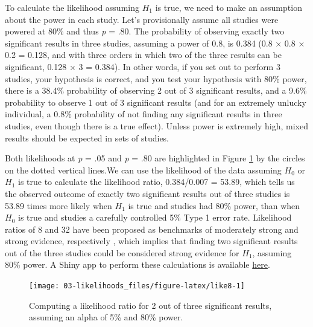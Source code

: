 \documentclass[
  oneside]{book}
\begin{document}
To calculate the likelihood assuming \(H_1\) is true, we need to make an assumption about the power in each study. Let's provisionally assume all studies were powered at 80\% and thus \emph{p} = .80. The probability of observing exactly two significant results in three studies, assuming a power of 0.8, is 0.384 (0.8 × 0.8 × 0.2 = 0.128, and with three orders in which two of the three results can be significant, 0.128 × 3 = 0.384). In other words, if you set out to perform 3 studies, your hypothesis is correct, and you test your hypothesis with 80\% power, there is a 38.4\% probability of observing 2 out of 3 significant results, and a 9.6\% probability to observe 1 out of 3 significant results (and for an extremely unlucky individual, a 0.8\% probability of not finding any significant results in three studies, even though there is a true effect). Unless power is extremely high, mixed results should be expected in sets of studies.

Both likelihoods at \emph{p} = .05 and \emph{p} = .80 are highlighted in Figure \ref{fig:like8} by the circles on the dotted vertical lines.We can use the likelihood of the data assuming \(H_0\) or \(H_1\) is true to calculate the likelihood ratio, 0.384/0.007 = 53.89, which tells us the observed outcome of exactly two significant results out of three studies is 53.89 times more likely when \(H_1\) is true and studies had 80\% power, than when \(H_0\) is true and studies a carefully controlled 5\% Type 1 error rate. Likelihood ratios of 8 and 32 have been proposed as benchmarks of moderately strong and strong evidence, respectively \citep{royall_statistical_1997}, which implies that finding two significant results out of the three studies could be considered strong evidence for \(H_1\), assuming 80\% power. A Shiny app to perform these calculations is available \href{https://shiny.ieis.tue.nl/mixed_results_likelihood/}{here}.



\begin{figure}

{\centering \texttt{[image: 03-likelihoods\_files/figure-latex/like8-1]} 

}

\caption{Computing a likelihood ratio for 2 out of three significant results, assuming an alpha of 5\% and 80\% power.}\label{fig:like8}
\end{figure}
\end{document}
